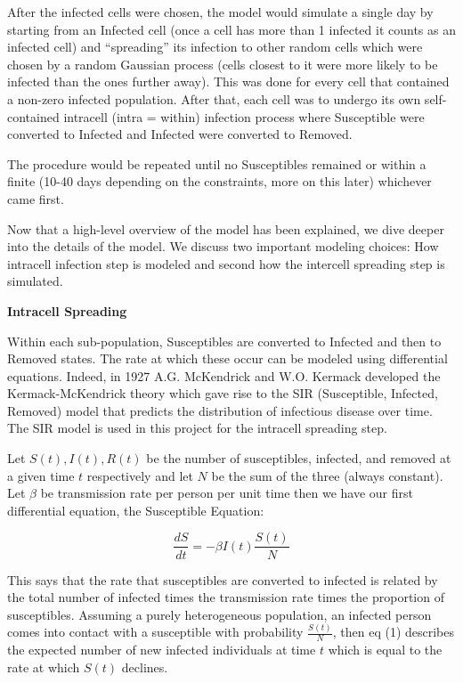 \documentclass[a4paper]{article}
\begin{document}
After the infected cells were chosen, the model would simulate a single day by starting
from an Infected cell (once a cell has more than 1 infected it counts as an
infected cell) and ``spreading'' its infection to other random cells which
were chosen by a random Gaussian process (cells closest to it were more likely
to be infected than the ones further away). This was done for every cell that
contained a non-zero infected population. After that, each cell was to undergo
its own self-contained intracell (intra = within) infection process where Susceptible were converted to
Infected and Infected were converted to Removed. 

The procedure would be repeated until no Susceptibles remained or within a
finite (10-40 days depending on the constraints, more on this later) whichever came first.

Now that a high-level overview of the model has been explained, we dive deeper
into the details of the model. We discuss two important modeling choices: How
intracell infection step is modeled and second how the intercell spreading step is
simulated.
\bigskip

\textbf{Intracell Spreading}

Within each sub-population, Susceptibles are converted to Infected and then to
Removed states. The rate at which these occur can be modeled using differential
equations. Indeed, in 1927 A.G. McKendrick and W.O. Kermack developed the
Kermack-McKendrick theory which gave rise to the SIR (Susceptible, Infected,
Removed) model that predicts the distribution of infectious disease over time.
The SIR model is used in this project for the intracell spreading step.

Let $S(t), I(t), R(t)$ be the number of susceptibles, infected, and removed at a 
given time $t$ respectively and let $N$ be the sum of the three (always
constant). Let $\beta$ be transmission rate per person per unit time then we
have our first differential equation, the Susceptible Equation:

\begin{equation}
  \frac{dS}{dt} = -\beta I(t) \frac{S(t)}{N}
\end{equation}

This says that the rate that susceptibles are converted to infected is related
by the total number of infected times the transmission rate times the proportion
of susceptibles. Assuming a purely heterogeneous population, an
infected person comes into contact with a susceptible with probability
$\frac{S(t)}{N}$, then eq (1) describes the expected number of new infected
individuals at time $t$ which is equal to the rate at which $S(t)$ declines.
\end{document}
